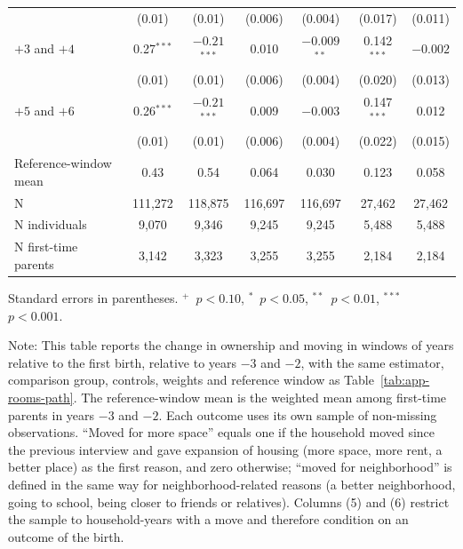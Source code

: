 \begin{table}[p]
\begin{tabular}{@{}l cccccc@{}}
 & (0.01) & (0.01) & (0.006) & (0.004) & (0.017) & (0.011) \\
$+3$ and $+4$ & 0.27$^{***}$ & $-0.21$$^{***}$ & 0.010 & $-0.009$$^{**}$ & 0.142$^{***}$ & $-0.002$ \\
 & (0.01) & (0.01) & (0.006) & (0.004) & (0.020) & (0.013) \\
$+5$ and $+6$ & 0.26$^{***}$ & $-0.21$$^{***}$ & 0.009 & $-0.003$ & 0.147$^{***}$ & 0.012 \\
 & (0.01) & (0.01) & (0.006) & (0.004) & (0.022) & (0.015) \\
Reference-window mean & 0.43 & 0.54 & 0.064 & 0.030 & 0.123 & 0.058 \\
N & 111,272 & 118,875 & 116,697 & 116,697 & 27,462 & 27,462 \\
N individuals & 9,070 & 9,346 & 9,245 & 9,245 & 5,488 & 5,488 \\
N first-time parents & 3,142 & 3,323 & 3,255 & 3,255 & 2,184 & 2,184 \\
\bottomrule
\end{tabular}
\par\smallskip
\begin{minipage}{0.97\linewidth}
\footnotesize Standard errors in parentheses. $^{+}$~$p<0.10$, $^{*}$~$p<0.05$, $^{**}$~$p<0.01$, $^{***}$~$p<0.001$.

\smallskip
Note: This table reports the change in ownership and moving in windows of
years relative to the first birth, relative to years $-3$ and $-2$, with the
same estimator, comparison group, controls, weights and reference window as
Table~\ref{tab:app-rooms-path}. The reference-window mean is the weighted mean
among first-time parents in years $-3$ and $-2$. Each outcome uses its own
sample of non-missing observations. ``Moved for more space'' equals one if the
household moved since the previous interview and gave expansion of housing (more space, more rent, a better place) as the
first reason, and zero otherwise; ``moved for neighborhood'' is defined in the
same way for neighborhood-related reasons (a better neighborhood, going to
school, being closer to friends or relatives). Columns (5) and (6) restrict
the sample to household-years with a move and therefore condition on an
outcome of the birth.
\end{minipage}
\end{table}

